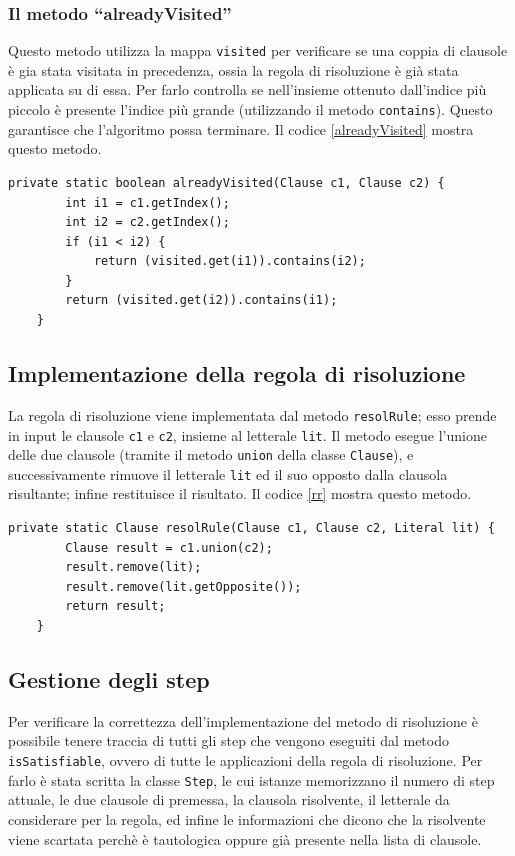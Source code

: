 \documentclass[a4paper,12pt]{report}
\begin{document}
\subsubsection{Il metodo ``alreadyVisited''}
Questo metodo utilizza la mappa \texttt{visited} per verificare se una coppia di clausole è gia stata visitata in precedenza, ossia la regola di risoluzione è già stata applicata su di essa. Per farlo controlla se nell'insieme ottenuto dall'indice più piccolo è presente l'indice più grande (utilizzando il metodo \texttt{contains}). Questo garantisce che l'algoritmo possa terminare. Il codice \ref{alreadyVisited} mostra questo metodo.

\begin{lstlisting}[caption={Metodo ``alreadyVisited'' della classe Resolution}, label={alreadyVisited}]
    private static boolean alreadyVisited(Clause c1, Clause c2) {
        int i1 = c1.getIndex();
        int i2 = c2.getIndex();
        if (i1 < i2) {
            return (visited.get(i1)).contains(i2);
        }
        return (visited.get(i2)).contains(i1);
    }
\end{lstlisting}



\subsection{Implementazione della regola di risoluzione}
\label{resolRule}
La regola di risoluzione viene implementata dal metodo \texttt{resolRule}; esso prende in input le clausole \texttt{c1} e \texttt{c2}, insieme al letterale \texttt{lit}. Il metodo esegue l'unione delle due clausole (tramite il metodo \texttt{union} della classe \texttt{Clause}), e successivamente rimuove il letterale \texttt{lit} ed il suo opposto dalla clausola risultante; infine restituisce il risultato. Il codice \ref{rr} mostra questo metodo.

\begin{lstlisting}[caption={Metodo ``resolRule'' della classe Resolution}, label={rr}]
    private static Clause resolRule(Clause c1, Clause c2, Literal lit) {
        Clause result = c1.union(c2);
        result.remove(lit);
        result.remove(lit.getOpposite());
        return result;
    }
\end{lstlisting}

\subsection{Gestione degli step}
\label{step}
Per verificare la correttezza dell'implementazione del metodo di risoluzione è possibile tenere traccia di tutti gli step che vengono eseguiti dal metodo \texttt{isSatisfiable}, ovvero di tutte le applicazioni della regola di risoluzione. Per farlo è stata scritta la classe \texttt{Step}, le cui istanze memorizzano il numero di step attuale, le due clausole di premessa, la clausola risolvente, il letterale da considerare per la regola, ed infine le informazioni che dicono che la risolvente viene scartata perchè è tautologica oppure già presente nella lista di clausole.
\end{document}
